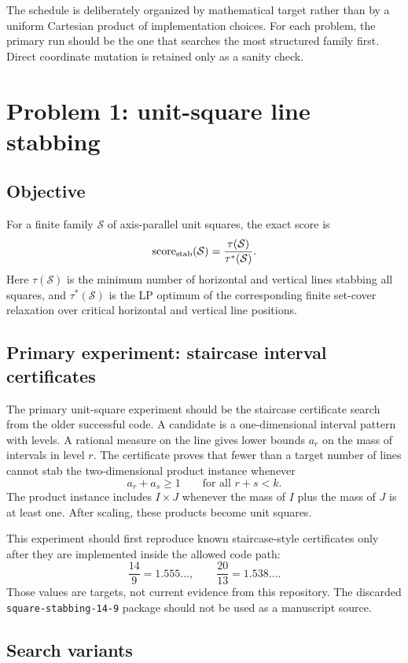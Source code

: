 \documentclass[11pt]{article}
\newcommand{\Scal}{\mathcal{S}}
\newcommand{\score}{\operatorname{score}}
\begin{document}
The schedule is deliberately organized by mathematical target rather than by a
uniform Cartesian product of implementation choices.  For each problem, the
primary run should be the one that searches the most structured family first.
Direct coordinate mutation is retained only as a sanity check.

\section{Problem 1: unit-square line stabbing}

\subsection{Objective}

For a finite family $\Scal$ of axis-parallel unit squares, the exact score is
\[
        \score_{\rm stab}(\Scal)=\frac{\tau(\Scal)}{\tau^*(\Scal)}.
\]
Here $\tau(\Scal)$ is the minimum number of horizontal and vertical lines
stabbing all squares, and $\tau^*(\Scal)$ is the LP optimum of the corresponding
finite set-cover relaxation over critical horizontal and vertical line
positions.

\subsection{Primary experiment: staircase interval certificates}

The primary unit-square experiment should be the staircase certificate search
from the older successful code.  A candidate is a one-dimensional interval
pattern with levels.  A rational measure on the line gives lower bounds
$a_r$ on the mass of intervals in level $r$.  The certificate proves that
fewer than a target number of lines cannot stab the two-dimensional product
instance whenever
\[
        a_r+a_s\geq 1
        \qquad\text{for all } r+s<k.
\]
The product instance includes $I\times J$ whenever the mass of $I$ plus the
mass of $J$ is at least one.  After scaling, these products become unit
squares.

This experiment should first reproduce known staircase-style certificates only
after they are implemented inside the allowed code path:
\[
        \frac{14}{9}=1.555\ldots,
        \qquad
        \frac{20}{13}=1.538\ldots.
\]
Those values are targets, not current evidence from this repository.  The
discarded \texttt{square-stabbing-14-9} package should not be used as a
manuscript source.

\subsection{Search variants}
\end{document}
